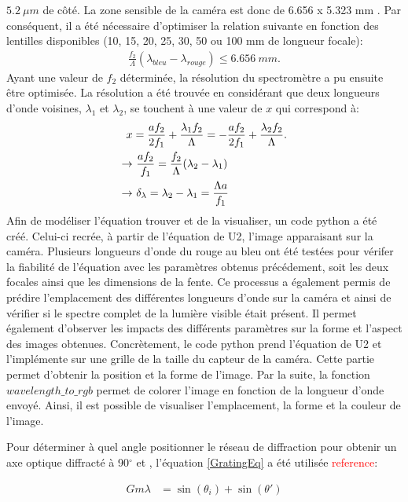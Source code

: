 \documentclass[conference]{IEEEtran}
\begin{document}
$5.2\ \mu m$ de côté. La zone sensible de la caméra est donc de 6.656 x 5.323 mm \cite{camera}. Par conséquent, il a été nécessaire d'optimiser la relation suivante
en fonction des lentilles disponibles (10, 15, 20, 25, 30, 50 ou 100 mm de longueur focale):
\begin{align}\label{spectre}
    \frac{f_2}{\Lambda}(\lambda_{bleu}-\lambda_{rouge})\leq 6.656\ mm.
\end{align}
Ayant une valeur de $f_2$ déterminée, la résolution du spectromètre a pu ensuite être optimisée. La résolution a été trouvée en
considérant que deux longueurs d'onde voisines, $\lambda_1$ et $\lambda_2$, se touchent à une valeur de $x$ qui correspond à:
\begin{align}\label{resolution}
    x&=\frac{a f_2}{2f_1}+\frac{\lambda_1 f_2}{\Lambda}=-\frac{a f_2}{2f_1}+\frac{\lambda_2 f_2}{\Lambda}.\notag \\
    \rightarrow&\ \frac{af_2}{f_1}=\frac{f_2}{\Lambda}(\lambda_2-\lambda_1)\notag\\
    \rightarrow&\ \delta_{\lambda}=\lambda_2-\lambda_1=\frac{\Lambda a}{f_1}
\end{align}
Afin de modéliser l'équation trouver et de la visualiser, un code python a été créé. Celui-ci recrée, à partir de l'équation
de U2, l'image apparaisant sur la caméra. Plusieurs longueurs d'onde du rouge au bleu ont été testées pour vérifer 
la fiabilité de l'équation avec les paramètres obtenus précédement, soit les deux focales ainsi que les dimensions de la fente. 
Ce processus a également permis de prédire l'emplacement des différentes longueurs d'onde sur la caméra 
et ainsi de vérifier si le spectre complet de la lumière visible était présent. Il permet également d'observer les
impacts des différents paramètres sur la forme et l'aspect des images obtenues. Concrètement, le code python prend 
l'équation de U2 et l'implémente sur une grille de la taille du capteur de la caméra. Cette partie permet d'obtenir 
la position et la forme de l'image. Par la suite, la fonction $wavelength\_to\_rgb$ permet de colorer l'image en fonction
de la longueur d'onde envoyé. Ainsi, il est possible de visualiser l'emplacement, la forme et la couleur de l'image.    

Pour déterminer à quel angle positionner le réseau de diffraction pour 
obtenir un axe optique diffracté à 90$^{\circ}$ et , l'équation \ref{GratingEq} a été utilisée \textcolor{red}{reference}:

\begin{align}\label{GratingEq}
    G m \lambda &= \sin(\theta_i) + \sin(\theta')
\end{align}
\end{document}

